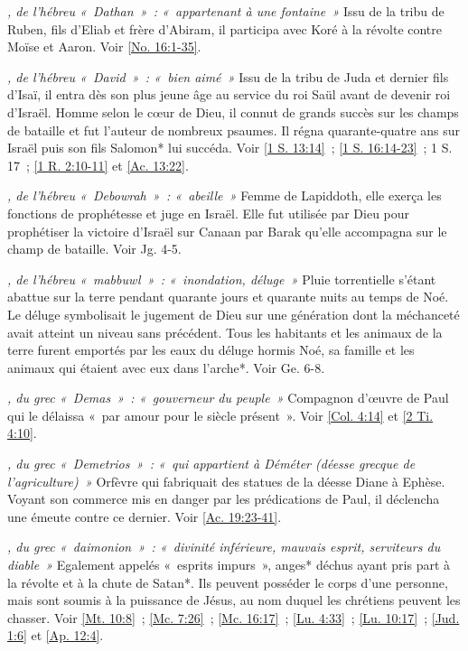 \begin{multicols}{2}
\textit{, de l'hébreu «~Dathan~»~: «~appartenant à une fontaine~»}\newline
Issu de la tribu de Ruben, fils d'Eliab et frère d'Abiram, il participa avec Koré à la révolte contre Moïse et Aaron. Voir \vref{No. 16:1-35}.

\textit{, de l'hébreu «~David~»~: «~bien aimé~»}\newline
Issu de la tribu de Juda et dernier fils d'Isaï, il entra dès son plus jeune âge au service du roi Saül avant de devenir roi d'Israël. Homme selon le cœur de Dieu, il connut de grands succès sur les champs de bataille et fut l'auteur de nombreux psaumes. Il régna quarante-quatre ans sur Israël puis son fils Salomon* lui succéda. Voir \vref{1 S. 13:14}~; \vref{1 S. 16:14-23}~; 1 S. 17~; \vref{1 R. 2:10-11} et \vref{Ac. 13:22}.

\textit{, de l'hébreu «~Debowrah~»~: «~abeille~»}\newline
Femme de Lapiddoth, elle exerça les fonctions de prophétesse et juge en Israël. Elle fut utilisée par Dieu pour prophétiser la victoire d'Israël sur Canaan par Barak qu'elle accompagna sur le champ de bataille. Voir Jg. 4-5.

\textit{, de l'hébreu «~mabbuwl~»~: «~inondation, déluge~»}\newline
Pluie torrentielle s'étant abattue sur la terre pendant quarante jours et quarante nuits au temps de Noé. Le déluge symbolisait le jugement de Dieu sur une génération dont la méchanceté avait atteint un niveau sans précédent. Tous les habitants et les animaux de la terre furent emportés par les eaux du déluge hormis Noé, sa famille et les animaux qui étaient avec eux dans l'arche*. Voir Ge. 6-8.

\textit{, du grec «~Demas~»~: «~gouverneur du peuple~»}\newline
Compagnon d'œuvre de Paul qui le délaissa «~par amour pour le siècle présent~». Voir \vref{Col. 4:14} et \vref{2 Ti. 4:10}.

\textit{, du grec «~Demetrios~»~: «~qui appartient à Déméter (déesse grecque de l'agriculture)~»}\newline
Orfèvre qui fabriquait des statues de la déesse Diane à Ephèse. Voyant son commerce mis en danger par les prédications de Paul, il déclencha une émeute contre ce dernier. Voir \vref{Ac. 19:23-41}.

\textit{, du grec «~daimonion~»~: «~divinité inférieure, mauvais esprit, serviteurs du diable~»}\newline
Egalement appelés «~esprits impurs~», anges* déchus ayant pris part à la révolte et à la chute de Satan*. Ils peuvent posséder le corps d'une personne, mais sont soumis à la puissance de Jésus, au nom duquel les chrétiens peuvent les chasser. Voir \vref{Mt. 10:8}~; \vref{Mc. 7:26}~; \vref{Mc. 16:17}~; \vref{Lu. 4:33}~; \vref{Lu. 10:17}~; \vref{Jud. 1:6} et \vref{Ap. 12:4}.


\end{multicols}
